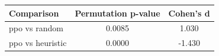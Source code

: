 \begin{tabular}{lcc}
\toprule
Comparison & Permutation p-value & Cohen's d \\
\midrule
ppo vs random & 0.0085 & 1.030 \\
ppo vs heuristic & 0.0000 & -1.430 \\
\bottomrule
\end{tabular}

